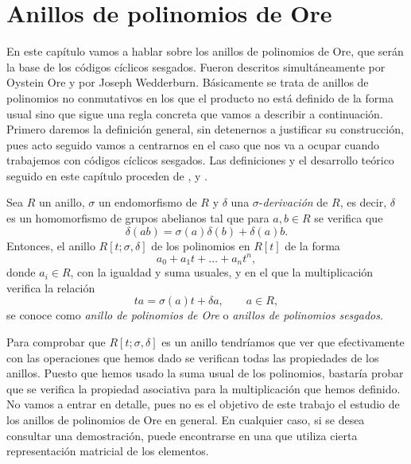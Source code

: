 \chapter{Anillos de polinomios de Ore}

En este capítulo vamos a hablar sobre los anillos de polinomios de Ore, que serán la base de los códigos cíclicos sesgados.
Fueron descritos simultáneamente por Oystein Ore \parencite{ore_theory_1933} y  por Joseph Wedderburn.
Básicamente se trata de anillos de polinomios no conmutativos en los que el producto no está definido de la forma usual sino que sigue una regla concreta que vamos a describir a continuación. 
Primero daremos la definición general, sin detenernos a justificar su construcción, pues acto seguido vamos a centrarnos en el caso que nos va a ocupar cuando trabajemos con códigos cíclicos sesgados.
Las definiciones y el desarrollo teórico seguido en este capítulo proceden de \parencite{jacobson_finite-dimensional_1996}, \parencite{ore_theory_1933} y \parencite{gomez-torrecillas_factoring_2020}.

\begin{definition}
  Sea \(R\) un anillo, \(\sigma\) un endomorfismo de \(R\) y \(\delta\) una \(\sigma\)-\textit{derivación} de \(R\), es decir, \(\delta\) es un homomorfismo de grupos abelianos tal que para \(a, b \in R\) se verifica que
  \[
    \delta(ab) = \sigma(a)\delta(b) + \delta(a)b.
  \]
  Entonces, el anillo \(R[t; \sigma, \delta]\) de los polinomios en \(R[t]\) de la forma
  \[
    a_0 + a_1t + \dots + a_nt^n,
  \]
  donde \(a_i \in R\), con la igualdad y suma usuales, y en el que la multiplicación verifica la relación 
  \[
  ta = \sigma(a)t + \delta a, \qquad a \in R,
  \]
  se conoce como \textit{anillo de polinomios de Ore} o \textit{anillos de polinomios sesgados}.
\end{definition}

Para comprobar que \(R[t; \sigma, \delta]\) es un anillo tendríamos que ver que efectivamente con las operaciones que hemos dado se verifican todas las propiedades de los anillos.
Puesto que hemos usado la suma usual de los polinomios, bastaría probar que se verifica la propiedad asociativa para la multiplicación que hemos definido.
No vamos a entrar en detalle, pues no es el objetivo de este trabajo el estudio de los anillos de polinomios de Ore en general.
En cualquier caso, si se desea consultar una demostración, puede encontrarse en \parencite[p. 2-3]{jacobson_finite-dimensional_1996} una que utiliza cierta representación matricial de los elementos.

